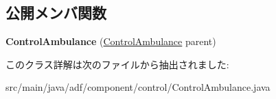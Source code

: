 \subsection*{公開メンバ関数}
\begin{DoxyCompactItemize}
\item 
\hypertarget{classadf_1_1component_1_1control_1_1ControlAmbulance_ade5e6a6110e83443fbef51dec9d2723b}{}\label{classadf_1_1component_1_1control_1_1ControlAmbulance_ade5e6a6110e83443fbef51dec9d2723b} 
{\bfseries Control\+Ambulance} (\hyperlink{classadf_1_1component_1_1control_1_1ControlAmbulance}{Control\+Ambulance} parent)
\end{DoxyCompactItemize}


このクラス詳解は次のファイルから抽出されました\+:\begin{DoxyCompactItemize}
\item 
src/main/java/adf/component/control/Control\+Ambulance.\+java\end{DoxyCompactItemize}
